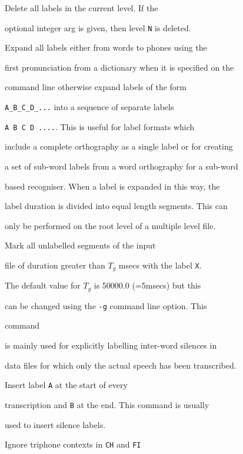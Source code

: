 \begin{varlist}


    Delete all labels in the current level.  If the


     optional integer arg is given, then level \texttt{N} is deleted.


    Expand all labels either from words to phones using the 


        first pronunciation from a dictionary when it is specified on the 


        command line otherwise expand labels of the form 


        \texttt{A\_B\_C\_D\_...} into a sequence of separate labels 


        \texttt{A B C D ....}.  This is useful for label formats which 


        include a complete orthography as a single label or for creating 


        a set of sub-word labels from a word orthography for a sub-word 


        based recogniser.  When a label is expanded in this way, the 


        label duration is divided into equal length segments.  This can


        only be performed on the root level of a multiple level file.


    Mark all unlabelled segments of the input


       file of duration greater than $T_g$ msecs with the label \texttt{X}.


       The default value for $T_g$ is 50000.0 (=5msecs) but this


       can be changed using the \texttt{-g} command line option.  This


       command


       is mainly used for explicitly labelling inter-word silences in


       data files for which only the actual speech has been transcribed.


     Insert label \texttt{A} at the start of every


       transcription and \texttt{B} at the end.  This command is usually


       used to insert silence labels.


    Ignore triphone contexts in \texttt{CH} and \texttt{FI}



\end{varlist}
